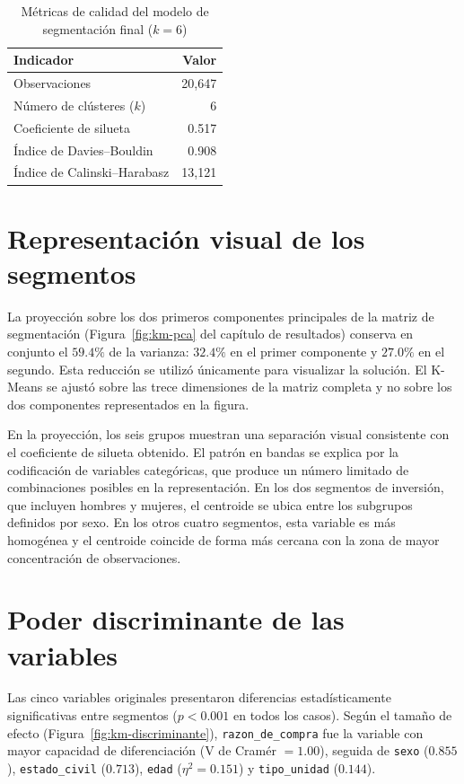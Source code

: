\begin{table}[H]
\centering
\caption{Métricas de calidad del modelo de segmentación final ($k=6$)}
\label{cuad:km-metricas}
\begin{tabular}{lr}
\hline
\textbf{Indicador} & \textbf{Valor} \\
\hline
Observaciones                       & 20{,}647 \\
Número de clústeres ($k$)            & 6 \\
Coeficiente de silueta              & 0.517 \\
Índice de Davies--Bouldin           & 0.908 \\
Índice de Calinski--Harabasz        & 13{,}121 \\
\hline
\end{tabular}
\fuentepropia
\end{table}

\section{Representación visual de los segmentos}

La proyección sobre los dos primeros componentes principales de la matriz de
segmentación (Figura~\ref{fig:km-pca} del capítulo de resultados) conserva en
conjunto el $59.4\%$ de la varianza: $32.4\%$ en el primer componente y $27.0\%$ en
el segundo. Esta reducción se utilizó únicamente para visualizar la solución. El
K-Means se ajustó sobre las trece dimensiones de la matriz completa y no sobre los
dos componentes representados en la figura.

En la proyección, los seis grupos muestran una separación visual consistente con el
coeficiente de silueta obtenido. El patrón en bandas se explica por la codificación de
variables categóricas, que produce un número limitado de combinaciones posibles en la
representación. En los dos segmentos de inversión, que incluyen hombres y mujeres,
el centroide se ubica entre los subgrupos definidos por sexo. En los otros cuatro
segmentos, esta variable es más homogénea y el centroide coincide de forma más cercana
con la zona de mayor concentración de observaciones.

\section{Poder discriminante de las variables}

Las cinco variables originales presentaron diferencias estadísticamente
significativas entre segmentos ($p<0.001$ en todos los casos). Según el tamaño de
efecto (Figura~\ref{fig:km-discriminante}), \texttt{razon\_de\_compra} fue la
variable con mayor capacidad de diferenciación (V de Cramér $=1.00$), seguida de
\texttt{sexo} ($0.855$), \texttt{estado\_civil} ($0.713$), \texttt{edad}
($\eta^2=0.151$) y \texttt{tipo\_unidad} ($0.144$).


